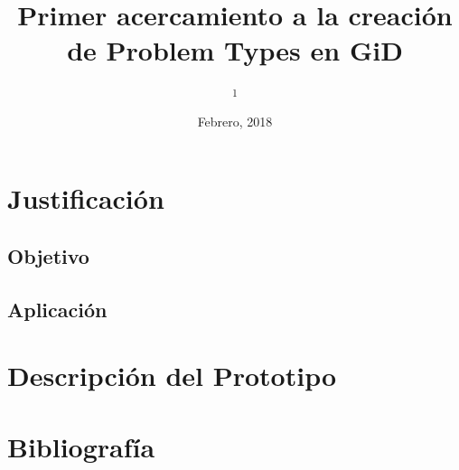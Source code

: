 \documentclass[10pt, a4paper, twocolumn]{article} %
\title{Primer acercamiento a la creación de Problem Types en GiD} %
\author{
	\authorstyle{Luis G. Yáñez Rodríguez\textsuperscript{1}} %
	\newline\newline %
	\textsuperscript{1}\institution{Universidad de Guanajuato, Guanajuato, México}\\ %
}
\date{Febrero, 2018} %
\begin{document}
\maketitle %

\thispagestyle{firstpage} %




\section{Justificación}


\subsection{Objetivo}


\subsection{Aplicación}


\section{Descripción del Prototipo}


\section{Bibliografía}




\end{document}
